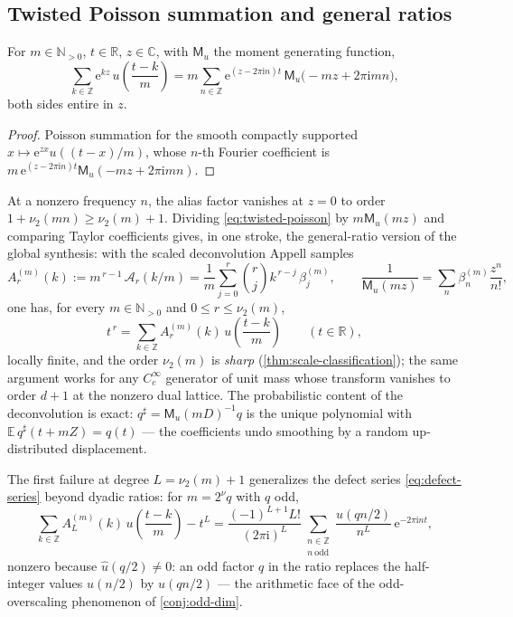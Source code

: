 \documentclass[11pt,oneside]{article}
\numberwithin{equation}{section}
\theoremstyle{definition}
\theoremstyle{remark}
\newcommand{\R}{\mathbb R}
\newcommand{\C}{\mathbb C}
\newcommand{\N}{\mathbb N}
\newcommand{\Z}{\mathbb Z}
\newcommand{\E}{\mathbb E}
\newcommand{\e}{\mathrm e}
\newcommand{\ii}{\mathrm i}
\newcommand{\vtwo}{\nu_2}
\newcommand{\MM}{\mathsf M}
\newcommand{\Gd}{\mathcal A}
\begin{document}
\subsection{Twisted Poisson summation and general ratios}

\begin{lemma}
\label{lem:twisted-poisson}
For $m\in\N_{>0}$, $t\in\R$, $z\in\C$, with
$\MM_u$ the moment generating function,
\begin{equation}
 \sum_{k\in\Z}\e^{kz}\,u\!\left(\frac{t-k}{m}\right)
 =m\sum_{n\in\Z}\e^{(z-2\pi\ii n)t}\,
 \MM_u\!\bigl(-mz+2\pi\ii mn\bigr),
 \label{eq:twisted-poisson}
\end{equation}
both sides entire in $z$.
\end{lemma}

\begin{proof}
Poisson summation for the smooth compactly supported
$x\mapsto\e^{zx}u((t-x)/m)$, whose $n$-th Fourier coefficient is
$m\,\e^{(z-2\pi\ii n)t}\MM_u(-mz+2\pi\ii mn)$.
\end{proof}

At a nonzero frequency $n$, the alias factor vanishes at $z=0$ to
order $1+\vtwo(mn)\ge\vtwo(m)+1$.  Dividing
\eqref{eq:twisted-poisson} by $m\MM_u(mz)$ and comparing Taylor
coefficients gives, in one stroke, the general-ratio version of the
global synthesis: with the scaled deconvolution Appell samples
\begin{equation}
 A^{(m)}_r(k):=m^{\,r-1}\,\Gd_r(k/m)
 =\frac1m\sum_{j=0}^{r}\binom rj k^{\,r-j}\,\beta^{(m)}_j,
 \qquad
 \frac1{\MM_u(mz)}=\sum_n\beta^{(m)}_n\frac{z^{n}}{n!},
 \label{eq:scaled-appell}
\end{equation}
one has, for every $m\in\N_{>0}$ and $0\le r\le\vtwo(m)$,
\begin{equation}
 t^{\,r}=\sum_{k\in\Z}A^{(m)}_r(k)\,
 u\!\left(\frac{t-k}{m}\right)
 \qquad(t\in\R),
 \label{eq:general-reproduction}
\end{equation}
locally finite, and the order $\vtwo(m)$ is \emph{sharp}
(\cref{thm:scale-classification}); the same argument works for any
$C_c^\infty$ generator of unit mass whose transform vanishes to
order $d+1$ at the nonzero dual lattice.  The probabilistic content
of the deconvolution is exact:
$q^{\sharp}=\MM_u(mD)^{-1}q$ is the unique polynomial with
$\E\,q^{\sharp}(t+mZ)=q(t)$ --- the coefficients undo smoothing by a
random up-distributed displacement.

The first failure at degree $L=\vtwo(m)+1$ generalizes the defect
series \eqref{eq:defect-series} beyond dyadic ratios: for
$m=2^{\nu}q$ with $q$ odd,
\begin{equation}
 \sum_{k\in\Z}A^{(m)}_L(k)\,u\!\left(\frac{t-k}{m}\right)-t^{L}
 =\frac{(-1)^{L+1}L!}{(2\pi\ii)^{L}}
 \sum_{\substack{n\in\Z\\ n\ \mathrm{odd}}}
 \frac{\widehat u(qn/2)}{n^{L}}\,\e^{-2\pi\ii nt},
 \label{eq:general-defect}
\end{equation}
nonzero because $\widehat u(q/2)\ne0$: an odd factor $q$ in the ratio
replaces the half-integer values $\widehat u(n/2)$ by
$\widehat u(qn/2)$ --- the arithmetic face of the odd-overscaling
phenomenon of \cref{conj:odd-dim}.
\end{document}
